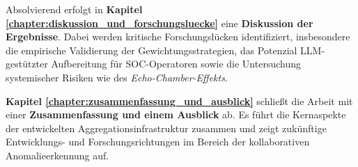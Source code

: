 Absolvierend erfolgt in \textbf{Kapitel \ref{chapter:diskussion_und_forschungsluecke}} eine \textbf{Diskussion der Ergebnisse}. Dabei werden kritische Forschungslücken identifiziert, insbesondere die empirische Validierung der Gewichtungsstrategien, das Potenzial LLM-gestützter Aufbereitung für SOC-Operatoren sowie die Untersuchung systemischer Risiken wie des \textit{Echo-Chamber-Effekts}.

\textbf{Kapitel \ref{chapter:zusammenfassung_und_ausblick}} schließt die Arbeit mit einer \textbf{Zusammenfassung und einem Ausblick} ab. Es führt die Kernaspekte der entwickelten Aggregationsinfrastruktur zusammen und zeigt zukünftige Entwicklungs- und Forschungsrichtungen im Bereich der kollaborativen Anomalieerkennung auf.